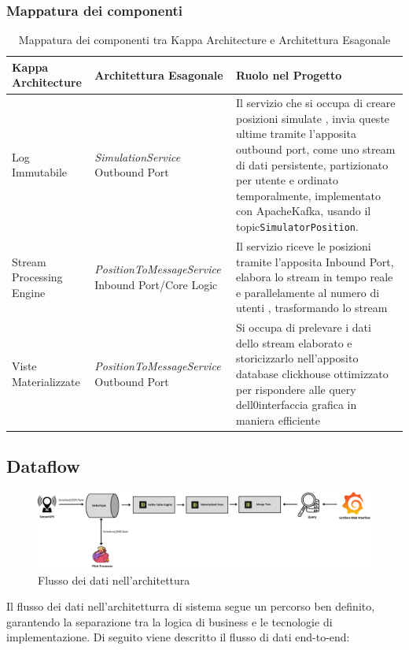 \documentclass[10pt]{article}
\begin{document}
\subsubsection{Mappatura dei componenti}

\begin{table}[H]
\centering
\renewcommand{\arraystretch}{1.5}
\begin{tabular}{|>{\centering\arraybackslash}m{4cm}|>{\centering\arraybackslash}m{4cm}|>{\raggedright\arraybackslash}m{6cm}|}
\hline
\rowcolor{gray!25}
\textbf{Kappa Architecture} & \textbf{Architettura Esagonale} & \textbf{Ruolo nel Progetto} \\
\hline
Log Immutabile & \textit{SimulationService} Outbound Port & Il servizio che si occupa di creare posizioni simulate , invia queste ultime tramite l'apposita outbound port, come uno stream di dati persistente, partizionato per utente e ordinato temporalmente, implementato con ApacheKafka, usando il topic\texttt{SimulatorPosition}. \\
\hline
Stream Processing Engine & \textit{PositionToMessageService} Inbound Port/Core Logic & Il servizio riceve le posizioni tramite l'apposita Inbound Port, elabora lo stream in tempo reale e parallelamente al numero di utenti , trasformando lo stream\\
\hline
Viste Materializzate & \textit{PositionToMessageService} Outbound Port & Si occupa di prelevare i dati dello stream elaborato e storicizzarlo nell'apposito database clickhouse ottimizzato per rispondere alle query dell0interfaccia grafica in maniera efficiente \\
\hline
\end{tabular}
\caption{Mappatura dei componenti tra Kappa Architecture e Architettura Esagonale}
\label{tab:mappatura_componenti}
\end{table}



    \subsection{Dataflow}

    \begin{figure}[H]
        \centering
        \includegraphics[width=\textwidth]{Dataflow.pdf}
        \caption{Flusso dei dati nell'architettura}
    \end{figure}
    Il flusso dei dati nell'architetturra di sistema segue un percorso ben definito, garantendo la separazione tra la logica di business e le tecnologie di implementazione. Di seguito viene descritto il flusso di dati end-to-end:
    
\end{document}
